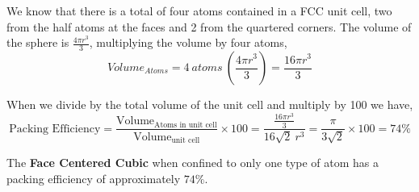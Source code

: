 \documentclass[paper=a4, fontsize=11pt]{scrartcl} %
\numberwithin{equation}{section} %
\numberwithin{figure}{section} %
\numberwithin{table}{section} %
\begin{document}
We know that there is a total of four atoms contained in a FCC unit cell, two from the half atoms at the faces and 2 from the quartered corners. The volume of the sphere is $\frac{4 \pi r^3}{3}$, multiplying the volume by four atoms,
\begin{equation*}
Volume_{Atoms} = 4\ atoms\ (\frac{4 \pi r^3}{3}) = \frac{16 \pi r^3}{3} 
\end{equation*}

When we divide by the total volume of the unit cell and multiply by 100 we have,
\begin{equation*}
\text{Packing Efficiency} = \frac{\text{Volume}_{\text{Atoms  in  unit cell}}}{\text{Volume}_{\text{unit cell}}} \times 100 = \frac{\frac{16 \pi r^3}{3} }{16\sqrt{2}\ r^3 } = \frac{\pi}{3\sqrt{2}} \times 100 = 74 \% 
\end{equation*}

The \textbf{Face Centered Cubic} when confined to only one type of atom has a packing efficiency of approximately $74\%$.
\end{document}
